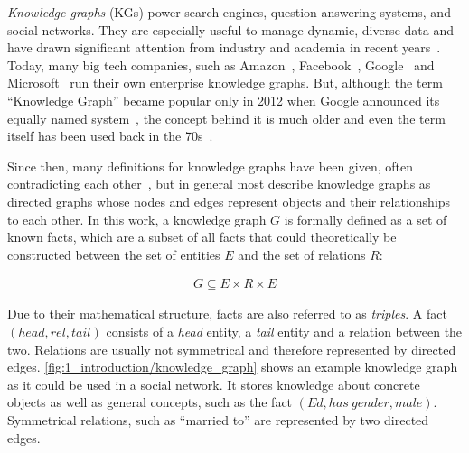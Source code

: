 \emph{Knowledge graphs} (KGs) power search engines, question-answering systems, and social networks. They are especially useful to manage dynamic, diverse data and have drawn significant attention from industry and academia in recent years~\cite{Hogan2021KnowledgeG}. Today, many big tech companies, such as Amazon~\cite{AmazonKG}, Facebook~\cite{Noy2019IndustryscaleKG}, Google~\cite{GoogleKG} and Microsoft~\cite{MicrosoftKG} run their own enterprise knowledge graphs. But, although the term ``Knowledge Graph'' became popular only in 2012 when Google announced its equally named system~\cite{GoogleKG}, the concept behind it is much older and even the term itself has been used back in the 70s~\cite{Schneider1973CourseMA}.

Since then, many definitions for knowledge graphs have been given, often contradicting each other~\cite{Bergman2019ACS, Bonatti2018KnowledgeGN, Ehrlinger2016TowardsAD}, but in general most describe knowledge graphs as directed graphs whose nodes and edges represent objects and their relationships to each other. In this work, a knowledge graph $G$ is formally defined as a set of known facts, which are a subset of all facts that could theoretically be constructed between the set of entities $E$ and the set of relations $R$:

\begin{align}
    G \subseteq E \times R \times E
    \label{eq:1_introduction/graph}
\end{align}

Due to their mathematical structure, facts are also referred to as \emph{triples}. A fact $(head, rel, tail)$ consists of a \emph{head} entity, a \emph{tail} entity and a relation between the two. Relations are usually not symmetrical and therefore represented by directed edges. \autoref{fig:1_introduction/knowledge_graph} shows an example knowledge graph as it could be used in a social network. It stores knowledge about concrete objects as well as general concepts, such as the fact $(Ed, has~gender, male)$. Symmetrical relations, such as ``married to'' are represented by two directed edges.


